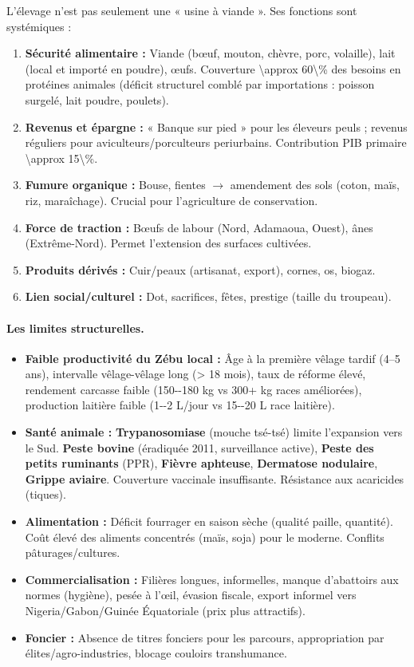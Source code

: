 \documentclass[11pt]{article}
\begin{document}
L'élevage n'est pas seulement une « usine à viande ». Ses fonctions sont systémiques :
\begin{enumerate}
    \item \textbf{Sécurité alimentaire :} Viande (bœuf, mouton, chèvre, porc, volaille), lait (local et importé en poudre), œufs. Couverture \num{\approx 60\%} des besoins en protéines animales (déficit structurel comblé par importations : poisson surgelé, lait poudre, poulets).
    \item \textbf{Revenus et épargne :} « Banque sur pied » pour les éleveurs peuls ; revenus réguliers pour aviculteurs/porculteurs periurbains. Contribution PIB primaire \num{\approx 15\%}.
    \item \textbf{Fumure organique :} Bouse, fientes $\rightarrow$ amendement des sols (coton, maïs, riz, maraîchage). Crucial pour l'agriculture de conservation.
    \item \textbf{Force de traction :} Bœufs de labour (Nord, Adamaoua, Ouest), ânes (Extrême-Nord). Permet l'extension des surfaces cultivées.
    \item \textbf{Produits dérivés :} Cuir/peaux (artisanat, export), cornes, os, biogaz.
    \item \textbf{Lien social/culturel :} Dot, sacrifices, fêtes, prestige (taille du troupeau).
\end{enumerate}

\paragraph{Les limites structurelles.}

\begin{itemize}
    \item \textbf{Faible productivité du Zébu local :} Âge à la première vêlage tardif (4--5 ans), intervalle vêlage-vêlage long (\num{> 18} mois), taux de réforme élevé, rendement carcasse faible (\num{150--180} kg vs \num{300+} kg races améliorées), production laitière faible (\num{1--2} L/jour vs \num{15--20} L race laitière).
    \item \textbf{Santé animale :} \textbf{Trypanosomiase} (mouche tsé-tsé) limite l'expansion vers le Sud. \textbf{Peste bovine} (éradiquée 2011, surveillance active), \textbf{Peste des petits ruminants} (PPR), \textbf{Fièvre aphteuse}, \textbf{Dermatose nodulaire}, \textbf{Grippe aviaire}. Couverture vaccinale insuffisante. Résistance aux acaricides (tiques).
    \item \textbf{Alimentation :} Déficit fourrager en saison sèche (qualité paille, quantité). Coût élevé des aliments concentrés (maïs, soja) pour le moderne. Conflits pâturages/cultures.
    \item \textbf{Commercialisation :} Filières longues, informelles, manque d'abattoirs aux normes (hygiène), pesée à l'œil, évasion fiscale, export informel vers Nigeria/Gabon/Guinée Équatoriale (prix plus attractifs).
    \item \textbf{Foncier :} Absence de titres fonciers pour les parcours, appropriation par élites/agro-industries, blocage couloirs transhumance.
\end{itemize}
\end{document}
